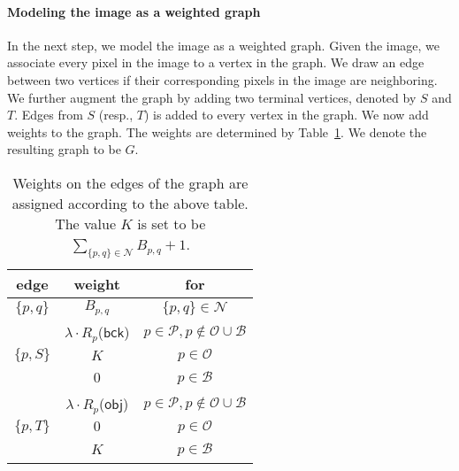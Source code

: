 \documentclass{acm}
\newcommand{\setpixels}{\mathcal{P}}
\newcommand{\setobj}{\mathcal{O}}
\newcommand{\setbck}{\mathcal{B}}
\newcommand{\obj}{\mathsf{obj}}
\newcommand{\background}{\mathsf{bck}}
\newcommand{\setneighbors}{\mathcal{N}}
\begin{document}
\paragraph{Modeling the image as a weighted graph} In the next step, we model the image as a weighted graph. Given the image, we associate every pixel in the image to a vertex in the graph. We draw an edge between two vertices if their corresponding pixels in the image are neighboring. We further augment the graph by adding two terminal vertices, denoted by $S$ and $T$. Edges from $S$ (resp., $T$) is added to every vertex in the graph. We now add weights to the graph. The weights are determined by Table~\ref{fig:table}. We denote the resulting graph to be $G$. 


\begin{table}[ht]
\begin{tabular}{| c | c | c |}
  \hline
  \textbf{edge} & \textbf{weight} & \textbf{for} \\ \hline \hline
  $\{p,q\}$ & $B_{p,q}$ & $\{p,q\} \in \setneighbors$ \\ \hline
  \ & $\lambda \cdot R_p$($\background$) & $p \in \setpixels, p \notin \setobj \cup \setbck$  \\ \cline{2-3}
  $\{p,S\}$ & $K$ & $p \in \setobj$ \\ \cline{2-3}
  \ & $0$ & $p \in \setbck$ \\
  \hline
  \ & $\lambda \cdot R_p$($\obj$) & $p \in \setpixels, p \notin \setobj \cup \setbck$  \\ \cline{2-3}
  $\{p,T\}$ & $0$ & $p \in \setobj$ \\ \cline{2-3}
  \ & $K$ & $p \in \setbck$ \\
  \hline
\end{tabular}
\caption{Weights on the edges of the graph are assigned according to the above table. The value $K$ is set to be $\sum_{\{p,q\} \in \setneighbors} {B_{p,q}}+1$. }
\label{fig:table}
\end{table}
\end{document}
